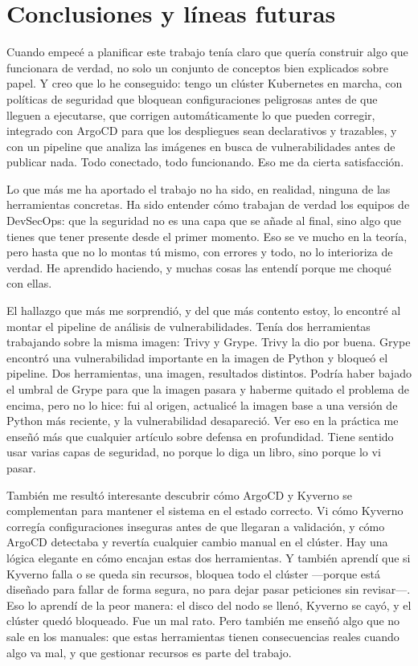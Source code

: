 \chapter{Conclusiones y líneas futuras}

Cuando empecé a planificar este trabajo tenía claro que quería construir algo que funcionara de verdad, no solo un conjunto de conceptos bien explicados sobre papel. Y creo que lo he conseguido: tengo un clúster Kubernetes en marcha, con políticas de seguridad que bloquean configuraciones peligrosas antes de que lleguen a ejecutarse, que corrigen automáticamente lo que pueden corregir, integrado con ArgoCD para que los despliegues sean declarativos y trazables, y con un pipeline que analiza las imágenes en busca de vulnerabilidades antes de publicar nada. Todo conectado, todo funcionando. Eso me da cierta satisfacción.

Lo que más me ha aportado el trabajo no ha sido, en realidad, ninguna de las herramientas concretas. Ha sido entender cómo trabajan de verdad los equipos de DevSecOps: que la seguridad no es una capa que se añade al final, sino algo que tienes que tener presente desde el primer momento. Eso se ve mucho en la teoría, pero hasta que no lo montas tú mismo, con errores y todo, no lo interioriza de verdad. He aprendido haciendo, y muchas cosas las entendí porque me choqué con ellas.

El hallazgo que más me sorprendió, y del que más contento estoy, lo encontré al montar el pipeline de análisis de vulnerabilidades. Tenía dos herramientas trabajando sobre la misma imagen: Trivy y Grype. Trivy la dio por buena. Grype encontró una vulnerabilidad importante en la imagen de Python y bloqueó el pipeline. Dos herramientas, una imagen, resultados distintos. Podría haber bajado el umbral de Grype para que la imagen pasara y haberme quitado el problema de encima, pero no lo hice: fui al origen, actualicé la imagen base a una versión de Python más reciente, y la vulnerabilidad desapareció. Ver eso en la práctica me enseñó más que cualquier artículo sobre defensa en profundidad. Tiene sentido usar varias capas de seguridad, no porque lo diga un libro, sino porque lo vi pasar.

También me resultó interesante descubrir cómo ArgoCD y Kyverno se complementan para mantener el sistema en el estado correcto. Vi cómo Kyverno corregía configuraciones inseguras antes de que llegaran a validación, y cómo ArgoCD detectaba y revertía cualquier cambio manual en el clúster. Hay una lógica elegante en cómo encajan estas dos herramientas. Y también aprendí que si Kyverno falla o se queda sin recursos, bloquea todo el clúster —porque está diseñado para fallar de forma segura, no para dejar pasar peticiones sin revisar—. Eso lo aprendí de la peor manera: el disco del nodo se llenó, Kyverno se cayó, y el clúster quedó bloqueado. Fue un mal rato. Pero también me enseñó algo que no sale en los manuales: que estas herramientas tienen consecuencias reales cuando algo va mal, y que gestionar recursos es parte del trabajo.

